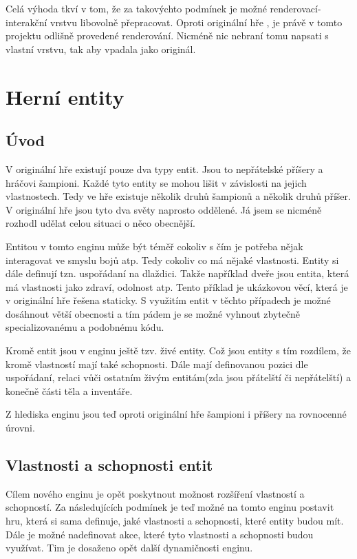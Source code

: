 Celá výhoda tkví v tom, že za takovýchto podmínek je možné renderovací-interakční vrstvu libovolně přepracovat. Oproti originální hře
, je právě v tomto projektu odlišně provedené renderování. Nicméně nic nebraní tomu napsati s vlastní vrstvu, tak aby vpadala jako originál.

\section{Herní entity}
\subsection{Úvod}
V originální hře existují pouze dva typy entit. Jsou to nepřátelské příšery a hráčovi šampioni. Každé tyto entity se mohou lišit 
v závislosti na jejich vlastnostech. Tedy ve hře existuje několik druhů šampionů a několik druhů příšer. V originální hře jsou 
tyto dva světy naprosto oddělené. Já jsem se nicméně rozhodl udělat celou situaci o něco obecnější.

Entitou v tomto enginu může být téměř cokoliv s čím je potřeba nějak interagovat ve smyslu bojů atp. Tedy cokoliv co má nějaké vlastnosti.
Entity si dále definují tzn. uspořádaní na dlaždici. Takže například dveře jsou entita, která má vlastnosti jako zdraví, odolnost atp.
Tento příklad je ukázkovou věcí, která je v originální hře řešena staticky. S využitím entit v těchto případech je možné dosáhnout  větší obecnosti
a tím pádem je se možné vyhnout zbytečně specializovanému a podobnému kódu.

Kromě entit jsou v enginu ještě tzv. živé entity. Což jsou entity s tím rozdílem, že kromě vlastností mají také schopnosti.
Dále mají definovanou pozici dle uspořádaní, relaci vůči ostatním živým entitám(zda jsou přátelští či nepřátelští) a 
konečně části těla a inventáře.

Z hlediska enginu jsou teď oproti originální hře šampioni i příšery na rovnocenné úrovni.

\subsection{Vlastnosti a schopnosti entit}
Cílem nového enginu je opět poskytnout možnost rozšíření vlastností a schopností.
Za následujících podmínek je teď možné na tomto enginu postavit hru, která si sama definuje, jaké vlastnosti a schopnosti, které entity budou mít.
Dále je možné nadefinovat akce, které tyto vlastnosti a schopnosti budou využívat. Tim je dosaženo opět další dynamičnosti enginu.

